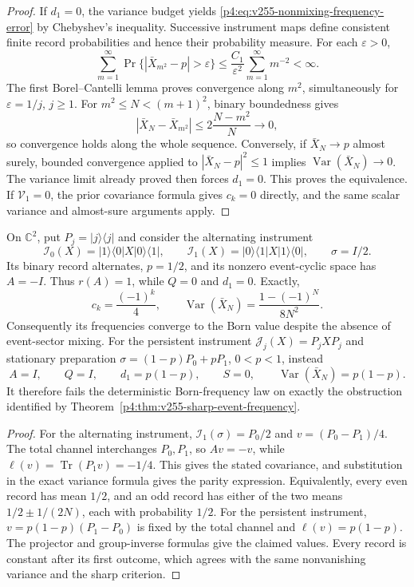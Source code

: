 \documentclass[12pt,a4paper]{article}
\begin{document}
\begin{proof}
If $d_1=0$, the variance budget yields \eqref{p4:eq:v255-nonmixing-frequency-error}
by Chebyshev's inequality. Successive instrument maps define consistent
finite record probabilities and hence their probability measure. For each
$\varepsilon>0$,
\[
 \sum_{m=1}^\infty
 \Pr\{|\bar X_{m^2}-p|>\varepsilon\}
 \le\frac{C_1}{\varepsilon^2}\sum_{m=1}^\infty m^{-2}<\infty.
\]
The first Borel--Cantelli lemma proves convergence along $m^2$,
simultaneously for $\varepsilon=1/j$, $j\ge1$. For
$m^2\le N<(m+1)^2$, binary boundedness gives
\[
 |\bar X_N-\bar X_{m^2}|
 \le2\frac{N-m^2}{N}\longrightarrow0,
\]
so convergence holds along the whole sequence. Conversely, if
$\bar X_N\to p$ almost surely, bounded convergence applied to
$|\bar X_N-p|^2\le1$ implies
$\operatorname{Var}(\bar X_N)\to0$. The variance limit already proved
then forces $d_1=0$. This proves the equivalence. If
$\mathcal V_1=0$, the prior covariance formula gives $c_k=0$ directly,
and the same scalar variance and almost-sure arguments apply.
\end{proof}

\begin{proposition}
\label{p4:prop:v255-periodic-persistent-records}
On $\mathbb C^2$, put $P_j=|j\rangle\langle j|$ and consider the
alternating instrument
\[
 \mathcal I_0(X)=|1\rangle\langle0|X|0\rangle\langle1|,
 \qquad
 \mathcal I_1(X)=|0\rangle\langle1|X|1\rangle\langle0|,
 \qquad \sigma=I/2.
\]
Its binary record alternates, $p=1/2$, and its nonzero event-cyclic
space has $A=-I$. Thus $r(A)=1$, while $Q=0$ and $d_1=0$. Exactly,
\[
 c_k=\frac{(-1)^k}{4},\qquad
 \operatorname{Var}(\bar X_N)
 =\frac{1-(-1)^N}{8N^2}.
\]
Consequently its frequencies converge to the Born value despite the
absence of event-sector mixing.
For the persistent instrument
$\mathcal J_j(X)=P_jXP_j$ and stationary preparation
$\sigma=(1-p)P_0+pP_1$, $0<p<1$, instead
\[
 A=I,\qquad Q=I,\qquad d_1=p(1-p),\qquad S=0,
 \qquad\operatorname{Var}(\bar X_N)=p(1-p).
\]
It therefore fails the deterministic Born-frequency law on exactly the
obstruction identified by Theorem~\ref{p4:thm:v255-sharp-event-frequency}.
\end{proposition}
\begin{proof}
For the alternating instrument,
$\mathcal I_1(\sigma)=P_0/2$ and
$v=(P_0-P_1)/4$. The total channel interchanges $P_0,P_1$, so
$Av=-v$, while $\ell(v)=\operatorname{Tr}(P_1v)=-1/4$.
This gives the stated covariance, and substitution in the exact variance
formula gives the parity expression. Equivalently, every even record
has mean $1/2$, and an odd record has either of the two means
$1/2\pm1/(2N)$, each with probability $1/2$.
For the persistent instrument,
$v=p(1-p)(P_1-P_0)$ is fixed by the total channel and
$\ell(v)=p(1-p)$. The projector and group-inverse formulas give the
claimed values. Every record is constant after its first outcome,
which agrees with the same nonvanishing variance and the sharp criterion.
\end{proof}
\end{document}

